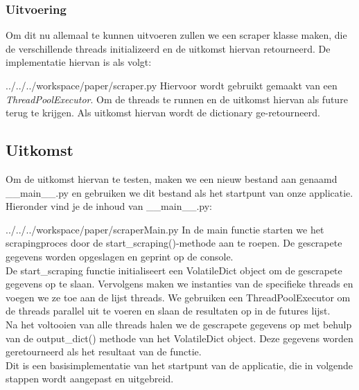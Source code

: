 \subsubsection{Uitvoering}
Om dit nu allemaal te kunnen uitvoeren zullen we een scraper klasse maken, die de verschillende threads initializeerd en de uitkomst hiervan retourneerd. De implementatie hiervan is als volgt: 
\begin{pythoncode}{../../../workspace/paper/scraper.py}
    Hiervoor wordt gebruikt gemaakt van een \emph{ThreadPoolExecutor}. Om de threads te runnen en de uitkomst hiervan als future terug te krijgen. Als uitkomst hiervan wordt de dictionary ge-retourneerd.
\end{pythoncode}

\subsection{Uitkomst}
Om de uitkomst hiervan te testen, maken we een nieuw bestand aan genaamd \_\_main\_\_.py en gebruiken we dit bestand als het startpunt van onze applicatie. Hieronder vind je de inhoud van \_\_main\_\_.py:
\begin{pythoncode}{../../../workspace/paper/scraperMain.py}
In de main functie starten we het scrapingproces door de start\_scraping()-methode aan te roepen. De gescrapete gegevens worden opgeslagen en geprint op de console. \\

De start\_scraping functie initialiseert een VolatileDict object om de gescrapete gegevens op te slaan. Vervolgens maken we instanties van de specifieke threads en voegen we ze toe aan de lijst threads. We gebruiken een ThreadPoolExecutor om de threads parallel uit te voeren en slaan de resultaten op in de futures lijst. \\

Na het voltooien van alle threads halen we de gescrapete gegevens op met behulp van de output\_dict() methode van het VolatileDict object. Deze gegevens worden geretourneerd als het resultaat van de functie. \\

Dit is een basisimplementatie van het startpunt van de applicatie, die in volgende stappen wordt aangepast en uitgebreid.
\end{pythoncode}

